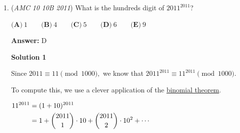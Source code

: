 \begin{enumerate}
 Since the altitude of the larger pyramid is the sum of the edge length of the cube and the altitude of the smaller pyramid, we have 
 \[\dfrac{\sqrt{2}}{2}=x+\dfrac{\sqrt{2}}{2}x\] 
 \[x=\sqrt{2}-1\]

 Finally, $V_{cube}=x^3=(\sqrt{2}-1)^3=\boxed{\textbf{(A)} 5\sqrt{2}-7}$




\textbf{Solution 3(basics)}

The lateral faces are equilateral triangles with side length $1$, so the slant height is $\frac{\sqrt{3}}{2}$. The distance from the base center to a vertex is $\frac{\sqrt{2}}{2}$, so the pyramid's altitude is

 
 \[h = \sqrt{1^2 - \left(\frac{\sqrt{2}}{2}\right)^2} = \frac{\sqrt{2}}{2}.\]

 
In the diagonal cross-section (base $\sqrt{2}$, height $\frac{\sqrt{2}}{2}$), let $x$ be half the cube’s side length. The alignment condition gives

 
 \[(0.5 - x)\sqrt{2} = 2x.\]

 Solving:

 
 \[0.5\sqrt{2} = x(2 + \sqrt{2}) \quad \Rightarrow \quad x = \frac{\sqrt{2} - 1}{2}.\]

 The cube’s side length is $2x = \sqrt{2} - 1$, so the volume is

 
 \[(2x)^3 = (\sqrt{2} - 1)^3 = 5\sqrt{2} - 7\]

 \[\boxed{5\sqrt{2} - 7}\]

 by Iamokatmath

 


	\item (\textit{AMC 10 10B 2011}) What is the hundreds digit of $2011^{2011}$?


 $\textbf{(A)}\ 1 \qquad\textbf{(B)}\ 4 \qquad\textbf{(C)}\ 5 \qquad\textbf{(D)}\ 6 \qquad\textbf{(E)}\ 9$

 \textbf{Answer: }D



\textbf{Solution 1}

Since $2011 \equiv 11  \pmod{1000},$ we know that $2011^{2011} \equiv 11^{2011}  \pmod{1000}.$

 To compute this, we use a clever application of the \href{https://artofproblemsolving.com/wiki/index.php?title=Binomial\_theorem}{binomial theorem}.

 $\begin{aligned} 11^{2011} &= (1+10)^{2011} \\ &= 1 + \dbinom{2011}{1} \cdot 10 + \dbinom{2011}{2} \cdot 10^2 + \cdots \end{aligned}$


\end{enumerate}
